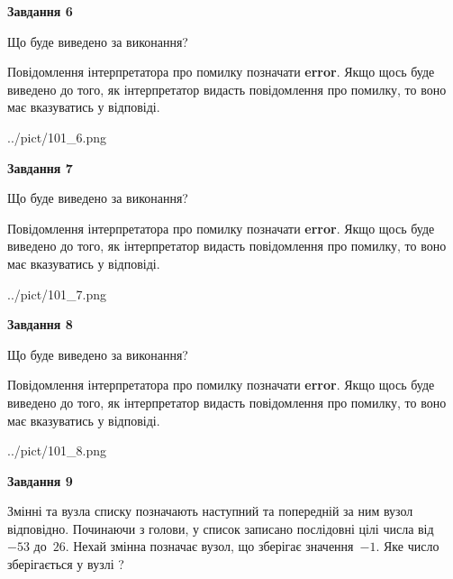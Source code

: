 \documentclass[12pt, ukrainian]{article}
\begin{document}
{\begin {large}
{\begin {center}\textbf{Завдання 6}\end {center}}\par
Що буде виведено за виконання?

Повідомлення інтерпретатора про помилку позначати \textbf{error}.
Якщо щось буде виведено до того, як інтерпретатор видасть повідомлення про помилку, 
то воно має вказуватись у відповіді. \par


\begin{center}
	{../pict/101_6.png}
\end{center}
\newpage

{\begin {center}\textbf{Завдання 7}\end {center}}\par
Що буде виведено за виконання?

Повідомлення інтерпретатора про помилку позначати \textbf{error}.
Якщо щось буде виведено до того, як інтерпретатор видасть повідомлення про помилку, 
то воно має вказуватись у відповіді. \par


\begin{center}
	{../pict/101_7.png}
\end{center}
\newpage

{\begin {center}\textbf{Завдання 8}\end {center}}\par
Що буде виведено за виконання?

Повідомлення інтерпретатора про помилку позначати \textbf{error}.
Якщо щось буде виведено до того, як інтерпретатор видасть повідомлення про помилку, 
то воно має вказуватись у відповіді. \par


\begin{center}
	{../pict/101_8.png}
\end{center}
\newpage

{\begin {center}\textbf{Завдання 9}\end {center}}\par
Змінні  та  вузла списку позначають наступний та попередній за ним вузол відповідно. Починаючи з голови, у список записано послідовні цілі числа від~$-53$ до~$26$. Нехай змінна  позначає вузол, що зберігає значення~$-1$.
Яке число зберігається у вузлі  ?\par
\newpage


\end{large}}
\end{document}
